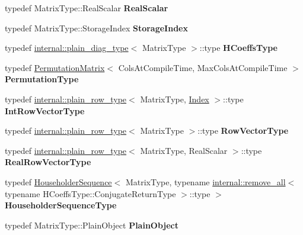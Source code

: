 \begin{DoxyCompactItemize}
\mbox{\label{group___q_r___module_aa9ac87cdab6bf619ca5802cca93ca4e1}} 
typedef Matrix\+Type\+::\+Real\+Scalar {\bfseries Real\+Scalar}
\item 
\mbox{\label{group___q_r___module_af255cba487b5513259359d5e27a68d73}} 
typedef Matrix\+Type\+::\+Storage\+Index {\bfseries Storage\+Index}
\item 
\mbox{\label{group___q_r___module_aca5b63fffae26e0e1eaa38d63b575038}} 
typedef \hyperlink{struct_eigen_1_1internal_1_1plain__diag__type}{internal\+::plain\+\_\+diag\+\_\+type}$<$ Matrix\+Type $>$\+::type {\bfseries H\+Coeffs\+Type}
\item 
\mbox{\label{group___q_r___module_ae60d0d820677d67b73258322bcae0a2d}} 
typedef \hyperlink{group___core___module_class_eigen_1_1_permutation_matrix}{Permutation\+Matrix}$<$ Cols\+At\+Compile\+Time, Max\+Cols\+At\+Compile\+Time $>$ {\bfseries Permutation\+Type}
\item 
\mbox{\label{group___q_r___module_acc44ac642c48935fe0da40c25035aa86}} 
typedef \hyperlink{struct_eigen_1_1internal_1_1plain__row__type}{internal\+::plain\+\_\+row\+\_\+type}$<$ Matrix\+Type, \hyperlink{namespace_eigen_a62e77e0933482dafde8fe197d9a2cfde}{Index} $>$\+::type {\bfseries Int\+Row\+Vector\+Type}
\item 
\mbox{\label{group___q_r___module_a7034cb4035db5e3d7c538c27c3d15212}} 
typedef \hyperlink{struct_eigen_1_1internal_1_1plain__row__type}{internal\+::plain\+\_\+row\+\_\+type}$<$ Matrix\+Type $>$\+::type {\bfseries Row\+Vector\+Type}
\item 
\mbox{\label{group___q_r___module_aa14f4af8219de2dcd8a1c43546d9dd4a}} 
typedef \hyperlink{struct_eigen_1_1internal_1_1plain__row__type}{internal\+::plain\+\_\+row\+\_\+type}$<$ Matrix\+Type, Real\+Scalar $>$\+::type {\bfseries Real\+Row\+Vector\+Type}
\item 
\mbox{\label{group___q_r___module_a9d4e0e44ac23ad8baf0f91e91b982dec}} 
typedef \hyperlink{group___householder___module_class_eigen_1_1_householder_sequence}{Householder\+Sequence}$<$ Matrix\+Type, typename \hyperlink{struct_eigen_1_1internal_1_1remove__all}{internal\+::remove\+\_\+all}$<$ typename H\+Coeffs\+Type\+::\+Conjugate\+Return\+Type $>$\+::type $>$ {\bfseries Householder\+Sequence\+Type}
\item 
\mbox{\label{group___q_r___module_a4db9c08da38e11bd598ed743061966b1}} 
typedef Matrix\+Type\+::\+Plain\+Object {\bfseries Plain\+Object}
\end{DoxyCompactItemize}
